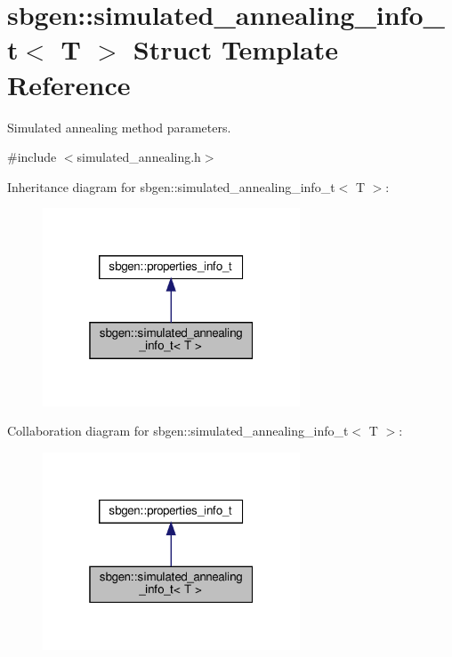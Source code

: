 \hypertarget{structsbgen_1_1simulated__annealing__info__t}{}\section{sbgen\+:\+:simulated\+\_\+annealing\+\_\+info\+\_\+t$<$ T $>$ Struct Template Reference}
\label{structsbgen_1_1simulated__annealing__info__t}


Simulated annealing method parameters.  




{\ttfamily \#include $<$simulated\+\_\+annealing.\+h$>$}



Inheritance diagram for sbgen\+:\+:simulated\+\_\+annealing\+\_\+info\+\_\+t$<$ T $>$\+:
\nopagebreak
\begin{figure}[H]
\begin{center}
\leavevmode
\includegraphics[width=217pt]{structsbgen_1_1simulated__annealing__info__t__inherit__graph}
\end{center}
\end{figure}


Collaboration diagram for sbgen\+:\+:simulated\+\_\+annealing\+\_\+info\+\_\+t$<$ T $>$\+:
\nopagebreak
\begin{figure}[H]
\begin{center}
\leavevmode
\includegraphics[width=217pt]{structsbgen_1_1simulated__annealing__info__t__coll__graph}
\end{center}
\end{figure}
